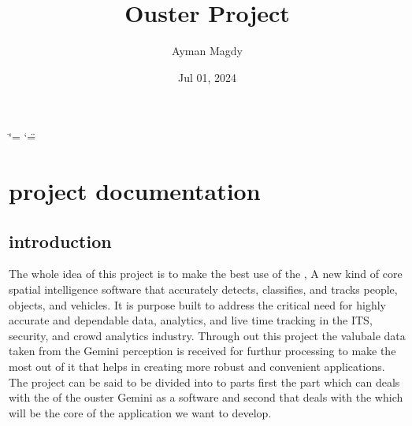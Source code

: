 \documentclass[letterpaper,10pt,english]{sphinxmanual}
\title{Ouster Project}
\date{Jul 01, 2024}
\author{Ayman Magdy}
\begin{document}
\ifdefined\shorthandoff
  \ifnum\catcode`\=\string=\active\shorthandoff{=}\fi
  \ifnum\catcode`\"=\active{}\fi
\fi

\pagestyle{empty}
\sphinxmaketitle
\pagestyle{plain}
\sphinxtableofcontents
\pagestyle{normal}
\label{\detokenize{index::doc}}


\sphinxstepscope


\chapter{project documentation}
\label{\detokenize{projectdoc:project-documentation}}\label{\detokenize{projectdoc::doc}}

\section{introduction}
\label{\detokenize{projectdoc:introduction}}
\sphinxAtStartPar
The whole idea of this project is to make the best use of the , A new kind of core spatial intelligence software that accurately detects, classifies, and tracks people, objects, and vehicles.
It is purpose built to address the critical need for highly accurate and dependable data, analytics, and live time tracking in the ITS, security, and crowd analytics industry. Through out this project the valubale
data taken from the Gemini perception is received for furthur processing to make the most out of it that helps in creating more robust and convenient applications.
The project can be said to be divided into to parts first the part which can deals with the  of the ouster Gemini as a software and second that deals with the  which will be the core of the application we want to develop.
\end{document}
